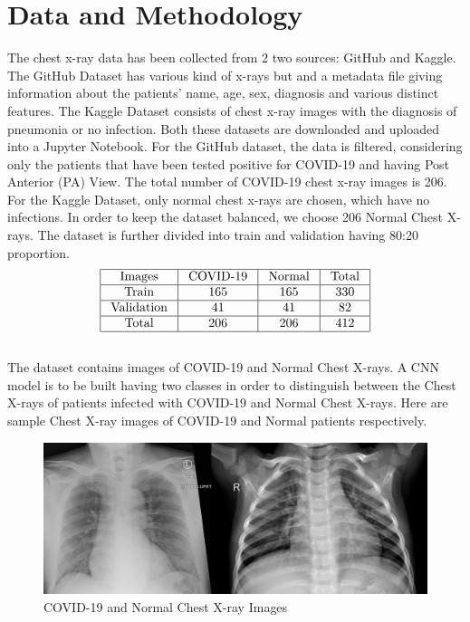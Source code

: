\documentclass[12pt]{revtex4}
\begin{document}
\section{Data and Methodology}
The chest x-ray data has been collected from 2 two sources: GitHub and Kaggle. The GitHub Dataset has various kind of x-rays but and a metadata file giving information about the patients’ name, age, sex, diagnosis and various distinct features. The Kaggle Dataset consists of chest x-ray images with the diagnosis of pneumonia or no infection. Both these datasets are downloaded and uploaded into a Jupyter Notebook. For the GitHub dataset, the data is filtered, considering only the patients that have been tested positive for COVID-19 and having Post Anterior (PA) View. The total number of COVID-19 chest x-ray images is 206. For the Kaggle Dataset, only normal chest x-rays are chosen, which have no infections. In order to keep the dataset balanced, we choose 206 Normal Chest X-rays. The dataset is further divided into train and validation having 80:20 proportion.
$$\begin{array}{|c|c|c|c|}
\hline \text { Images } & \text { COVID-19 } & \text { Normal } & \text { Total } \\
\hline \text { Train } & 165 & 165 & 330 \\
\hline \text { Validation } & 41 & 41 & 82 \\
\hline \text { Total } & 206 & 206 & 412 \\
\hline
\end{array}$$
\\The dataset contains images of COVID-19 and Normal Chest X-rays. A CNN model is to be built having two classes in order to distinguish between the Chest X-rays of patients infected with COVID-19 and Normal Chest X-rays. Here are sample Chest X-ray images of COVID-19 and Normal patients respectively.
\begin{figure}[htp]
    \centering
    \includegraphics[width=16cm]{CNN_Data.jpg}
    \caption{COVID-19 and Normal Chest X-ray Images}
    \label{fig:def}
\end{figure}
\end{document}
